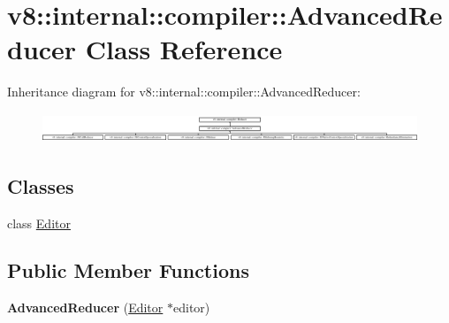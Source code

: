 \hypertarget{classv8_1_1internal_1_1compiler_1_1AdvancedReducer}{}\section{v8\+:\+:internal\+:\+:compiler\+:\+:Advanced\+Reducer Class Reference}
\label{classv8_1_1internal_1_1compiler_1_1AdvancedReducer}
Inheritance diagram for v8\+:\+:internal\+:\+:compiler\+:\+:Advanced\+Reducer\+:\begin{figure}[H]
\begin{center}
\leavevmode
\includegraphics[height=0.894569cm]{classv8_1_1internal_1_1compiler_1_1AdvancedReducer}
\end{center}
\end{figure}
\subsection*{Classes}
\begin{DoxyCompactItemize}
\item 
class \mbox{\hyperlink{classv8_1_1internal_1_1compiler_1_1AdvancedReducer_1_1Editor}{Editor}}
\end{DoxyCompactItemize}
\subsection*{Public Member Functions}
\begin{DoxyCompactItemize}
\item 
\mbox{\label{classv8_1_1internal_1_1compiler_1_1AdvancedReducer_abb941b5a245fa4b0c2e87c049fd78190}} 
{\bfseries Advanced\+Reducer} (\mbox{\hyperlink{classv8_1_1internal_1_1compiler_1_1AdvancedReducer_1_1Editor}{Editor}} $\ast$editor)
\end{DoxyCompactItemize}

